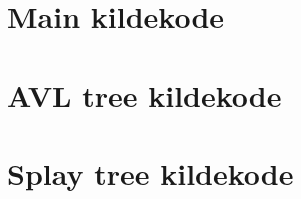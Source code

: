 \appendices
\section{Main kildekode}
\label{app:main}


\section{AVL tree kildekode}
\label{app:avl}

\bigskip
\bigskip


\section{Splay tree kildekode}
\label{app:splay}

\bigskip
\bigskip
